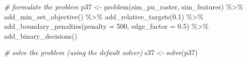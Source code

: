 \documentclass[
  12pt,
]{book}
\newenvironment{Shaded}{\begin{snugshade}}{\end{snugshade}}
\newcommand{\AttributeTok}[1]{\textcolor[rgb]{0.77,0.63,0.00}{#1}}
\newcommand{\CommentTok}[1]{\textcolor[rgb]{0.56,0.35,0.01}{\textit{#1}}}
\newcommand{\DecValTok}[1]{\textcolor[rgb]{0.00,0.00,0.81}{#1}}
\newcommand{\FloatTok}[1]{\textcolor[rgb]{0.00,0.00,0.81}{#1}}
\newcommand{\FunctionTok}[1]{\textcolor[rgb]{0.00,0.00,0.00}{#1}}
\newcommand{\NormalTok}[1]{#1}
\newcommand{\OtherTok}[1]{\textcolor[rgb]{0.56,0.35,0.01}{#1}}
\newcommand{\SpecialCharTok}[1]{\textcolor[rgb]{0.00,0.00,0.00}{#1}}
\begin{document}
\begin{Shaded}
\begin{Highlighting}[]
\CommentTok{\# formulate the problem}
\NormalTok{p37 }\OtherTok{\textless{}{-}} \FunctionTok{problem}\NormalTok{(sim\_pu\_raster, sim\_features) }\SpecialCharTok{\%\textgreater{}\%}
  \FunctionTok{add\_min\_set\_objective}\NormalTok{() }\SpecialCharTok{\%\textgreater{}\%}
  \FunctionTok{add\_relative\_targets}\NormalTok{(}\FloatTok{0.1}\NormalTok{) }\SpecialCharTok{\%\textgreater{}\%}
  \FunctionTok{add\_boundary\_penalties}\NormalTok{(}\AttributeTok{penalty =} \DecValTok{500}\NormalTok{, }\AttributeTok{edge\_factor =} \FloatTok{0.5}\NormalTok{) }\SpecialCharTok{\%\textgreater{}\%}
  \FunctionTok{add\_binary\_decisions}\NormalTok{()}

\CommentTok{\# solve the problem (using the default solver)}
\NormalTok{s37 }\OtherTok{\textless{}{-}} \FunctionTok{solve}\NormalTok{(p37)}
\end{Highlighting}
\end{Shaded}
\end{document}
